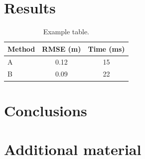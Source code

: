 \documentclass[11pt,a4paper,oneside]{report}
\begin{document}

\chapter{Results}\label{ch:results}
\begin{table}[t]
  \centering
  \caption{Example table.}\label{tab:example}
  \begin{tabular}{lcc}
    \toprule
    Method & RMSE (\si{\metre}) & Time (\si{\milli\second}) \\
    \midrule
    A & 0.12 & 15 \\
    B & 0.09 & 22 \\
    \bottomrule
  \end{tabular}
\end{table}

\chapter{Conclusions}\label{ch:conclusions}




\appendix
\chapter{Additional material}
\end{document}
